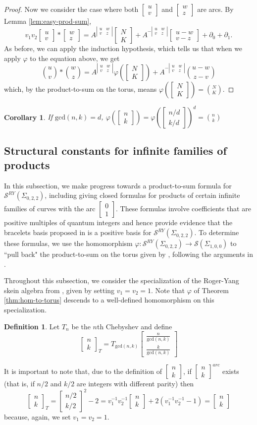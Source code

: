 \documentclass{article}
\newcommand{\del}{\partial}
\renewcommand{\phi}{\varphi}
\renewcommand{\gcd}{\text{gcd}}
\newcommand{\lildet}[4]{\left|\begin{smallmatrix}#1&#2\\#3&#4\end{smallmatrix}\right|}
\renewcommand{\S}{\mathcal{S}}
\newcommand{\SRY}{\mathcal{S}^{RY}}
\newcommand{\san}{\Sigma_{0,2,2}}
\newcommand{\sto}{\Sigma_{1,0,0}}
\newcommand{\twos}[2]{\left[\begin{smallmatrix}#1\\#2\end{smallmatrix}\right]}
\newcommand{\two}[2]{\begin{bmatrix}#1\\#2\end{bmatrix}}
\newtheorem{corollary}[theorem]{Corollary}
\theoremstyle{definition}
\newtheorem{definition}[theorem]{Definition}
\renewcommand{\san}{\Sigma_{0, 2, 2}}
\renewcommand{\SRY}{\ensuremath{ \mathcal S^{RY}}}
\begin{document}
\begin{proof}
Now we consider the case where both $\twos{u}{v}$ and $\twos{w}{z}$ are arcs. By Lemma \ref{lem:easy-prod-sum},
\[
v_1v_2\two{u}{v}*\two{w}{z}=A^{\lildet{u}{w}{v}{z}}\two{N}{K}+A^{-\lildet{u}{w}{v}{z}}\two{u-w}{v-z}+\del_0+\del_1.
\]
As before, we can apply the induction hypothesis, which tells us that when we apply $\phi$ to the equation above, we get
\[
{u\choose v}*{w\choose z}=A^{\lildet{u}{w}{v}{z}}\phi\left(\two{N}{K}\right)+A^{-\lildet{u}{w}{v}{z}}{u-w\choose z-v}
\]
which, by the product-to-sum on the torus, means $\phi(\twos{N}{K})={N\choose K}$.
\end{proof}

\begin{corollary}
    If $\gcd(n,k)=d$, $\phi(\twos{n}{k})=\phi(\twos{n/d}{k/d})^d={n\choose k}$
\end{corollary}

\subsection{Structural constants for infinite families of products}  \label{sec:strconst}

In this subsection, we make progress towards a product-to-sum formula for $\SRY(\san)$, including giving closed formulas for products of certain infinite families of curves with the arc $\twos{0}{1}$. These formulas involve coefficients that are positive multiples of quantum integers and hence provide evidence that the bracelets basis proposed in \cite{KaruoPositive} is a positive basis for $\SRY(\san)$. To determine these formulas, we use the homomorphism $\phi:\SRY(\san)\to \S(\sto)$ to ``pull back" the product-to-sum on the torus given by \cite{FrohmanGelca}, following the arguments in \cite{SikiFast}.

Throughout this subsection, we consider the specialization of the Roger-Yang skein algebra from \cite{KaruoPositive}, given by setting $v_1=v_2=1$. Note that $\phi$ of Theorem \ref{thm:hom-to-torus} descends to a well-defined homomorphism on this specialization.

\begin{definition}
    Let $T_n$ be the $n$th Chebyshev and define
    \[
    \two{n}{k}_T=T_{\gcd(n,k)}\two{\frac{n}{{\gcd(n,k)}}}{\frac{k}{\gcd(n,k)}}
    \]
\end{definition}

It is important to note that, due to the definition of $\twos{n}{k}$, if $\twos{n}{k}^{arc}$ exists (that is, if $n/2$ and $k/2$ are integers with different parity) then 
\[
\two{n}{k}_T=\two{n/2}{k/2}^2-2=v_1^{-1}v_2^{-1}\two{n}{k}+2(v_1^{-1}v_2^{-1}-1)=\two{n}{k}
\]
because, again, we set $v_1=v_2=1$.
\end{document}
